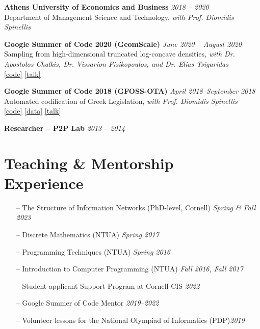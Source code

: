 \documentclass[margin]{res}
\newcommand{\field}[2]{\noindent \textbf{#1} \hfill #2 \\}
\newcommand{\specialurl}[2]{\href {#2} {{{[#1]}}}}
\newcommand{\code}[1]{\specialurl {code} {#1}}
\newcommand{\data}[1]{\specialurl {data} {#1}}
\newcommand{\talk}[1]{\specialurl {talk} {#1}}
\begin{document}
\begin{resume}
\field{Athens University of Economics and Business}{\emph{2018 -- 2020}}{Department of Management Science and Technology, \emph{with Prof. Diomidis Spinellis}}

\field{Google Summer of Code 2020 (GeomScale)}{\emph{June 2020 -- August 2020}}{{Sampling from high-dimensional truncated log-concave densities, \emph{with Dr. Apostolos Chalkis, Dr. Vissarion Fisikopoulos, and Dr. Elias Tsigaridas}} \\ \code{https://GeomScale/volesti} \talk{https://www.youtube.com/watch?v=P7YfC8Nn6sY}}

\field{Google Summer of Code 2018 (GFOSS-OTA)}{\emph{April 2018--September 2018}}{Automated codification of Greek Legislation, \emph{with Prof. Diomidis Spinellis} \\ \code{https://github.com/eellak/gsoc2018-3gm} \data{https://archive.org/details/greekgovernmentgazette} \talk{https://www.youtube.com/watch?v=_UIGsy85Ehw}}


\field{Researcher -- P2P Lab}{\emph{2013 -- 2014}}{}



\section{Teaching \& Mentorship \\ Experience} 
\begin{itemize}[nosep]
	\item[--] The Structure of Information Networks (PhD-level, Cornell) \hfill \emph{Spring \& Fall 2023} 
    \item[--] Discrete Mathematics (NTUA) \hfill \emph{Spring 2017}
    \item[--] Programming Techniques (NTUA) \hfill \emph{Spring 2016}
    \item[--] Introduction to Computer Programming (NTUA) \hfill \emph{Fall 2016, Fall 2017}
\end{itemize}

\medskip

\begin{itemize}[nosep]
	\item[--] Student-applicant Support Program at Cornell CIS \hfill \emph{2022}
	\item[--] Google Summer of Code Mentor \hfill \emph{2019--2022}
	\item[--] Volunteer lessons for the National Olympiad of Informatics (PDP)\hfill \emph{2019}
\end{itemize}



\end{resume}
\end{document}
